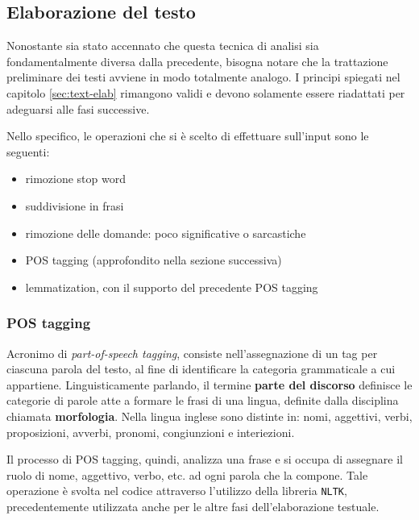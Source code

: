 \documentclass[hidelinks, 12pt]{article}
\begin{document}
\subsection{Elaborazione del testo}

Nonostante sia stato accennato che questa tecnica di analisi sia fondamentalmente diversa dalla precedente, bisogna notare che la trattazione preliminare dei testi avviene in modo totalmente analogo. I principi spiegati nel capitolo \ref{sec:text-elab} rimangono validi e devono solamente essere riadattati per adeguarsi alle fasi successive.

\vspace{3ex}

Nello specifico, le operazioni che si è scelto di effettuare sull'input sono le seguenti:

\begin{itemize}
	\item rimozione stop word
	\item suddivisione in frasi
	\item rimozione delle domande: poco significative o sarcastiche
	\item POS tagging (approfondito nella sezione successiva)
	\item lemmatization, con il supporto del precedente POS tagging
\end{itemize}


\subsubsection{POS tagging}

Acronimo di \textit{part-of-speech tagging}, consiste nell'assegnazione di un tag per ciascuna parola del testo, al fine di identificare la categoria grammaticale a cui appartiene. Linguisticamente parlando, il termine \textbf{parte del discorso} definisce le categorie di parole atte a formare le frasi di una lingua, definite dalla disciplina chiamata \textbf{morfologia}. Nella lingua inglese sono distinte in: nomi, aggettivi, verbi, proposizioni, avverbi, pronomi, congiunzioni e interiezioni.

Il processo di POS tagging, quindi, analizza una frase e si occupa di assegnare il ruolo di nome, aggettivo, verbo, etc. ad ogni parola che la compone. Tale operazione è svolta nel codice attraverso l'utilizzo della libreria \texttt{NLTK}, precedentemente utilizzata anche per le altre fasi dell'elaborazione testuale.
\end{document}
